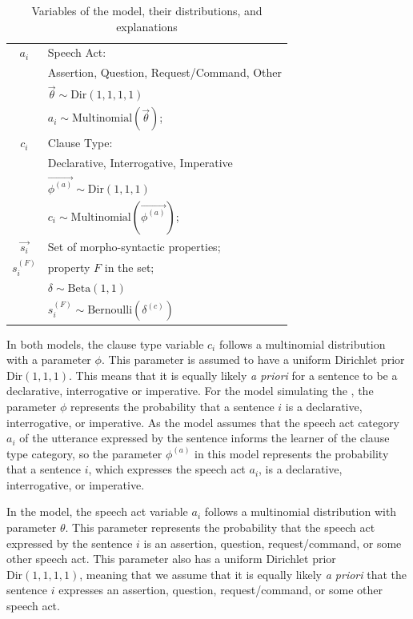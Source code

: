 \begin{table}[H]
    \centering
    \begin{tabular}{c|l}
    \hline
    \hline
        $a_{i}$ & Speech Act: \\
        	  &Assertion, Question, Request/Command, Other\\
          & $\vec{\theta} \sim \mbox{Dir}(1,1,1,1)$\\
          & $ a_{i} \sim \mbox{Multinomial}(\vec{\theta})$;\\

\hline
         $c_{i}$ &  Clause Type:\\
        & Declarative, Interrogative, Imperative\\
        &$\vec{\phi^{(a)}} \sim \mbox{Dir}(1,1,1)$\\
        &  $c_{i} \sim  \mbox{Multinomial}(\vec{\phi^{(a)}})$;\\
\hline
        $\vec{s_{i}}$ &  Set of morpho-syntactic properties; \\
        $s_{i}^{(F)}$ &  property $F$ in the set;  \\
        &$\delta\sim \mbox{Beta}(1,1)$\\        
        & $s_{i}^{(F)} \sim \mbox{Bernoulli}(\delta^{(c)})$ \\
    \hline
    \hline
    \end{tabular}
    \caption{Variables of the \plearnerabbr{} model, their distributions, and explanations}
    \label{tab:engcl:target-variables}
\end{table}






In both models, the clause type variable $c_{i}$ follows a multinomial distribution with a parameter $\phi$. This parameter is assumed to have a uniform Dirichlet prior $\mbox{Dir}(1,1,1)$. This means that it is equally likely \emph{a priori} for a sentence to be a declarative, interrogative or imperative. For the model simulating the \distlearner{}, the parameter $\phi$ represents the probability that a sentence $i$ is a declarative, interrogative, or imperative. As the \plearnerabbr{} model assumes that the speech act category $a_{i}$ of the utterance expressed by the sentence informs the learner of the clause type category, so the parameter $\phi^{(a)}$ in this model represents the probability that a sentence $i$, which expresses the speech act $a_{i}$, is a declarative, interrogative, or imperative. 

In the \plearnerabbr{} model, the speech act variable $a_{i}$ follows a multinomial distribution with parameter $\theta$. This parameter represents the probability that the speech act expressed by the sentence $i$ is an assertion, question, request/command, or some other speech act. This parameter also has a uniform Dirichlet prior $\mbox{Dir}(1,1,1,1)$, meaning that we assume that it is equally likely \emph{a priori} that the sentence $i$ expresses an assertion, question, request/command, or some other speech act.

